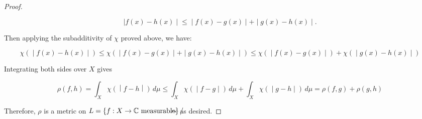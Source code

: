\documentclass{qlnotes-export}
\begin{document}
\begin{proof}
\begin{itemize}
  \[\left. |f(x) - h(x) \middle| \leq \middle| f(x) - g(x) \middle| + \middle| g(x) - h(x) \middle| . \right.\]

  Then applying the subadditivity of \(\chi\) proved above, we have:

  \[\left. \chi( \middle| f(x) - h(x) \middle| ) \leq \chi( \middle| f(x) - g(x) \middle| + \middle| g(x) - h(x) \middle| ) \leq \chi( \middle| f(x) - g(x) \middle| ) + \chi( \middle| g(x) - h(x) \middle| ) \right.\]

  Integrating both sides over \(X\) gives

  \[\left. \rho(f,h) = \int_{X}\chi( \middle| f - h \middle| )\, d\mu \leq \int_{X}\chi( \middle| f - g \middle| )\, d\mu + \int_{X}\chi( \middle| g - h \middle| )\, d\mu = \rho(f,g) + \rho(g,h) \right.\]
\end{itemize}

Therefore, \(\rho\) is a metric on \(L = \left\{ {f:X\rightarrow{\mathbb{C}}\ \text{measurable}} \right\}/\mspace{-18mu}\mspace{-18mu} \sim\) as desired.

\end{proof}
\end{document}
